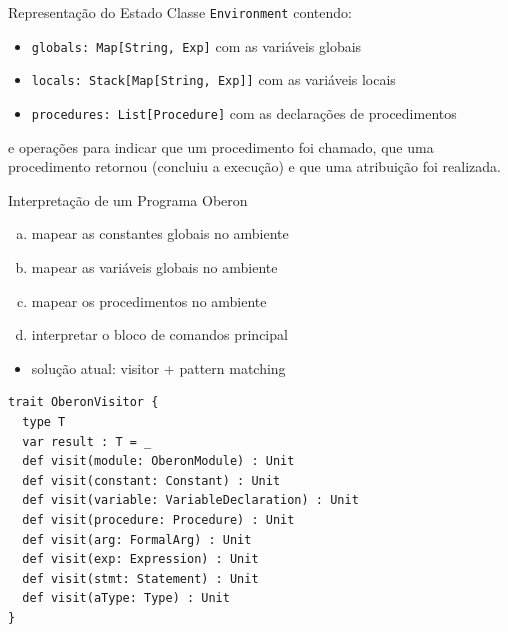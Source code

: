 \documentclass{beamer}
\begin{document}
\begin{frame}
  \begin{block}{Representa\c c\~{a}o do Estado}
    Classe \texttt{Environment} contendo: \pause
    \begin{itemize}
     \item \texttt{globals: Map[String, Exp]} com as vari\'{a}veis globais
     \item \texttt{locals: Stack[Map[String, Exp]]} com as vari\'{a}veis locais
     \item \texttt{procedures: List[Procedure]} com as declara\c c\~{o}es de procedimentos   
    \end{itemize} \pause
    e opera\c c\~{o}es para indicar que um procedimento foi chamado, que uma
    procedimento retornou (concluiu a execu\c c\~{a}o) e que uma atribui\c c\~{a}o
    foi realizada. 
  \end{block}  
\end{frame}

\begin{frame}
  \begin{block}{Interpreta\c c\~{a}o de um Programa Oberon}
    \begin{enumerate}[(a)]
     \item mapear as constantes globais no ambiente
     \item mapear as vari\'{a}veis globais no ambiente
     \item mapear os procedimentos no ambiente  
     \item interpretar o bloco de comandos principal \pause
    \end{enumerate}
  \end{block}
  
  \begin{itemize}
   \item solu\c c\~{a}o atual: {\color{blue}visitor} + {\color{blue}pattern matching}  
  \end{itemize}
\end{frame}

\begin{frame}[fragile]
  \begin{lstlisting}
trait OberonVisitor {
  type T
  var result : T = _
  def visit(module: OberonModule) : Unit
  def visit(constant: Constant) : Unit
  def visit(variable: VariableDeclaration) : Unit
  def visit(procedure: Procedure) : Unit
  def visit(arg: FormalArg) : Unit
  def visit(exp: Expression) : Unit
  def visit(stmt: Statement) : Unit
  def visit(aType: Type) : Unit
}
  \end{lstlisting} 
\end{frame}
\end{document}
